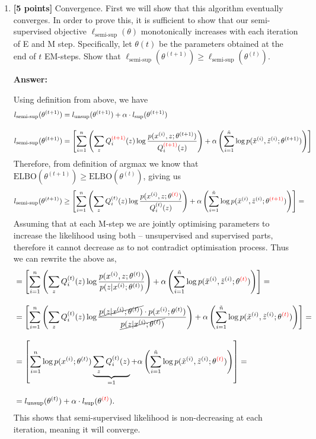 \documentclass{article}
\begin{document}
\begin{enumerate}[label=(\alph*)]
    \item \textbf{[5 points]} Convergence. First we will show that this algorithm eventually converges. In order to prove this, it is sufficient to show that our semi-supervised objective $\ell_{\text{semi-sup}}(\theta) $ monotonically increases with each iteration of E and M step. Specifically, let $\theta(t)$ be the parameters obtained at the end of $t$ EM-steps. Show that $\ell_{\text{semi-sup}}(\theta^{(t+1)}) \geq \ell_{\text{semi-sup}}(\theta^{(t)}).$

\textbf{Answer:}

Using definition from above, we have
\begin{align*}
l_{\text{semi-sup}}(\theta^{(t+1)}) &= l_{\text{unsup}}(\theta^{(t+1)}) + \alpha \cdot l_{\text{sup}}(\theta^{(t+1)})\\[10pt]
   l_{\text{semi-sup}}(\theta^{(t+1)})  &=  \left[\sum_{i=1}^{n} \left(\sum_{z}Q_i^{{\color{red}(t+1)}}(z)\log \frac{p(x^{(i)},z;\theta^{(t+1)})}{Q_i^{{\color{red}(t+1)}}(z)}\right)   + \alpha \left(\sum_{i=1}^{\tilde{n}} \log p(\tilde{x}^{(i)}, \tilde{z}^{(i)}; \theta^{(t+1)})\right)\right]
\end{align*}
Therefore, from definition of argmax we know that $
\text{ELBO}(\theta^{(t+1)})\geq\text{ELBO}(\theta^{(t)})$, giving us
\begin{align*}
l_{\text{semi-sup}}(\theta^{(t+1)}) &\geq  \left[\sum_{i=1}^{n} \left(\sum_{z}Q_i^{(t)}(z)\log \frac{p(x^{(i)},z;\theta^{{\color{red}(t)}})}{Q_i^{(t)}(z)}\right)   + \alpha \left(\sum_{i=1}^{\tilde{n}} \log p(\tilde{x}^{(i)}, \tilde{z}^{(i)}; \theta^{{\color{red}(t+1)}})\right)\right]=
\end{align*}
Assuming that at each M-step we are jointly optimising parameters to increase the likelihood using both -- unsupervised and supervised parts, therefore it cannot decrease as to not contradict optimisation process. Thus we can rewrite the above as,
\begin{align*}
    &=  \left[\sum_{i=1}^{n} \left(\sum_{z}Q_i^{(t)}(z)\log \frac{p(x^{(i)},z;\theta^{(t)})}{p(z|x^{(i)}; \theta^{(t)})}\right)   + \alpha \left(\sum_{i=1}^{\tilde{n}} \log p(\tilde{x}^{(i)}, \tilde{z}^{(i)}; \theta^{{\color{red}(t)}})\right)\right]=\\[10pt]
     &=   \left[\sum_{i=1}^{n} \left(\sum_{z}Q_i^{(t)}(z)\log \frac{\cancel{p(z|x^{(i)};\theta^{(t)})}\cdot p(x^{(i)}; \theta^{(t)})}{\cancel{p(z|x^{(i)};\theta^{(t)})}}\right)   + \alpha \left(\sum_{i=1}^{\tilde{n}} \log p(\tilde{x}^{(i)}, \tilde{z}^{(i)}; \theta^{{\color{red}(t)}})\right)\right]=\\[10pt]
     &=  \left[\sum_{i=1}^{n}\log p(x^{(i)}; \theta^{(t)})\underbrace{\sum_{z}Q_i^{(t)}(z)}_{=1}   + \alpha \left(\sum_{i=1}^{\tilde{n}} \log p(\tilde{x}^{(i)}, \tilde{z}^{(i)}; \theta^{{\color{red}(t)}})\right)\right]=\\[10pt]
     &= l_\text{unsup}(\theta^{(t)}) + \alpha\cdot l_\text{sup}(\theta^{{\color{red}(t)}}).
\end{align*}
This shows that semi-supervised likelihood is non-decreasing at each iteration, meaning it will converge.

\end{enumerate}
\end{document}
